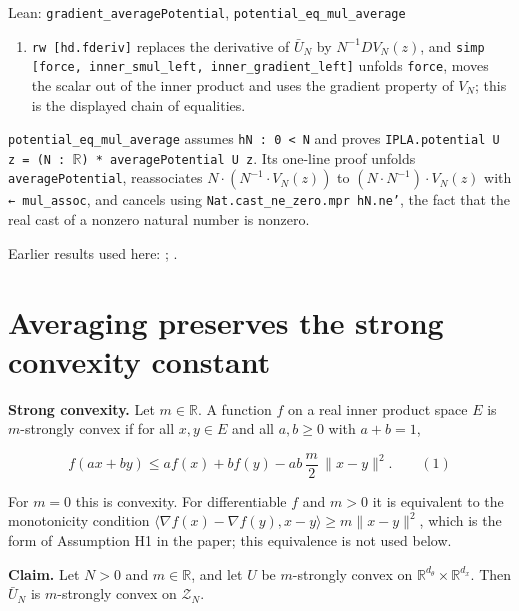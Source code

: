 \documentclass[11pt,a4paper]{article}
\begin{document}
\begin{leanbox}{Lean: \texttt{gradient\_\allowbreak{}averagePotential}, \texttt{potential\_\allowbreak{}eq\_\allowbreak{}mul\_\allowbreak{}average}}
\begin{enumerate}
\item \texttt{rw [hd.\allowbreak{}fderiv]} replaces the derivative of \(\bar U_N\) by \(N^{-1}DV_N(z)\), and \texttt{simp [force, inner\_\allowbreak{}smul\_\allowbreak{}left, inner\_\allowbreak{}gradient\_\allowbreak{}left]} unfolds \texttt{force}, moves the scalar out of the inner product and uses the gradient property of \(V_N\); this is the displayed chain of equalities.

\end{enumerate}



\texttt{potential\_\allowbreak{}eq\_\allowbreak{}mul\_\allowbreak{}average} assumes \texttt{h\allowbreak{}N : 0 < N} and proves \texttt{IPLA.\allowbreak{}potential U z = (N : \ensuremath{\mathbb R}) * average\allowbreak{}Potential U z}. Its one-line proof unfolds \texttt{average\allowbreak{}Potential}, reassociates \(N\cdot(N^{-1}\cdot V_N(z))\) to \((N\cdot N^{-1})\cdot V_N(z)\) with \texttt{← mul\_\allowbreak{}assoc}, and cancels using \texttt{Nat.\allowbreak{}cast\_\allowbreak{}ne\_\allowbreak{}zero.\allowbreak{}mpr h\allowbreak{}N.\allowbreak{}ne'}, the fact that the real cast of a nonzero natural number is nonzero.
\end{leanbox}


Earlier results used here: \cite[Section~3.1.1]{LangevinLean2026IPLA}; \cite[Section~3.1.3]{LangevinLean2026IPLA}.

\section{\texorpdfstring{Averaging preserves the strong convexity constant}{Averaging preserves the strong convexity constant}}


\textbf{Strong convexity.} Let \(m\in\mathbb R\). A function \(f\) on a real inner product space \(E\) is \(m\)-strongly convex if for all \(x,y\in E\) and all \(a,b\ge0\) with \(a+b=1\),


\[f(ax+by)\le af(x)+bf(y)-ab\,\frac m2\,\|x-y\|^2.\qquad(1)\]


For \(m=0\) this is convexity. For differentiable \(f\) and \(m>0\) it is equivalent to the monotonicity condition \(\langle\nabla f(x)-\nabla f(y),x-y\rangle\ge m\|x-y\|^2\), which is the form of Assumption H1 in the paper; this equivalence is not used below.




\textbf{Claim.} Let \(N>0\) and \(m\in\mathbb R\), and let \(U\) be \(m\)-strongly convex on \(\mathbb R^{d_\theta}\times\mathbb R^{d_x}\). Then \(\bar U_N\) is \(m\)-strongly convex on \(\mathcal Z_N\).
\end{document}
